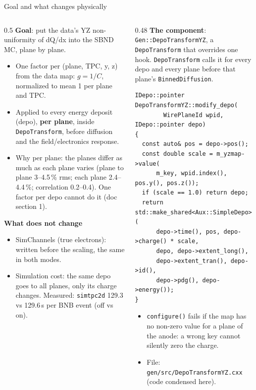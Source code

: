 \documentclass[aspectratio=169,10pt]{beamer}
\newcommand{\code}[1]{\texttt{#1}}
\begin{document}
\begin{frame}[fragile]{Goal and what changes physically}
\begin{columns}[T]
\begin{column}{0.5\textwidth}
\footnotesize
\textbf{Goal}: put the data's YZ non-uniformity of dQ/dx into the SBND MC, plane by plane.
\begin{itemize}
\item One factor per (plane, TPC, y, z) from the data map: $g = 1/C$, normalized to mean 1 per plane and TPC.
\item Applied to every energy deposit (depo), \textbf{per plane}, inside \code{DepoTransform}, before diffusion and the field/electronics response.
\item Why per plane: the planes differ as much as each plane varies (plane to plane 3--4.5\,\% rms; each plane 2.4--4.4\,\%; correlation 0.2--0.4). One factor per depo cannot do it (doc section 1).
\end{itemize}
\vspace{1mm}
\textbf{What does not change}
\begin{itemize}
\item SimChannels (true electrons): written before the scaling, the same in both modes.
\item Simulation cost: the same depo goes to all planes, only its charge changes. Measured: \code{simtpc2d} 129.3 vs 129.6\,s per BNB event (off vs on).
\end{itemize}
\end{column}
\begin{column}{0.48\textwidth}
\footnotesize
\textbf{The component}: \code{Gen::DepoTransformYZ}, a \code{DepoTransform} that overrides one hook. \code{DepoTransform} calls it for every depo and every plane before that plane's \code{BinnedDiffusion}.
\begin{lstlisting}
IDepo::pointer DepoTransformYZ::modify_depo(
        WirePlaneId wpid, IDepo::pointer depo)
{
  const auto& pos = depo->pos();
  const double scale = m_yzmap->value(
      m_key, wpid.index(), pos.y(), pos.z());
  if (scale == 1.0) return depo;
  return std::make_shared<Aux::SimpleDepo>(
      depo->time(), pos, depo->charge() * scale,
      depo, depo->extent_long(),
      depo->extent_tran(), depo->id(),
      depo->pdg(), depo->energy());
}
\end{lstlisting}
\vspace{1mm}
\begin{itemize}
\item \code{configure()} fails if the map has no non-zero value for a plane of the anode: a wrong key cannot silently zero the charge.
\item File: \code{gen/src/DepoTransformYZ.cxx} (code condensed here).
\end{itemize}
\end{column}
\end{columns}
\end{frame}
\end{document}
